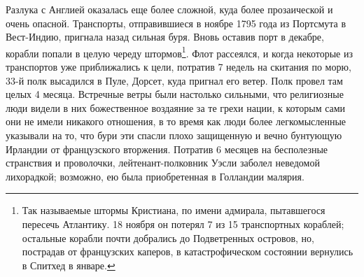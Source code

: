 \documentclass[
  oneside,
  12pt,
  titlepage]{book}
\begin{document}
Разлука с Англией оказалась еще более сложной, куда более прозаической и очень опасной. Транспорты, отправившиеся в ноябре 1795 года из Портсмута в Вест-Индию, пригнала назад сильная буря. Вновь оставив порт в декабре, корабли попали в целую череду штормов\footnote{Так называемые штормы Кристиана, по имени адмирала, пытавшегося пересечь Атлантику. 18 ноября он потерял 7 из 15 транспортных кораблей; остальные корабли почти добрались до Подветренных островов, но, пострадав от французских каперов, в катастрофическом состоянии вернулись в Спитхед в январе.}. Флот рассеялся, и когда некоторые из транспортов уже приближались к цели, потратив 7 недель на скитания по морю, 33-й полк высадился в Пуле, Дорсет, куда пригнал его ветер. Полк провел там целых 4 месяца. Встречные ветры были настолько сильными, что религиозные люди видели в них божественное воздаяние за те грехи нации, к которым сами они не имели никакого отношения, в то время как люди более легкомысленные указывали на то, что бури эти спасли плохо защищенную и вечно бунтующую Ирландии от французского вторжения. Потратив 6 месяцев на бесполезные странствия и проволочки, лейтенант-полковник Уэсли заболел неведомой лихорадкой; возможно, ею была приобретенная в Голландии малярия.
\end{document}
